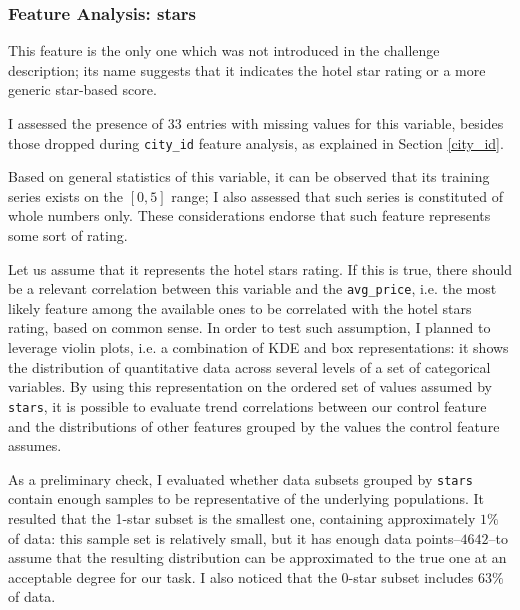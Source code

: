 \documentclass[preprint,12pt,3p]{elsarticle}
\begin{document}
\subsubsection{Feature Analysis: stars}
\label{stars}
This feature is the only one which was not introduced in the challenge description; its name suggests that it indicates the hotel star rating or a more generic star-based score.

I assessed the presence of $33$ entries with missing values for this variable, besides those dropped during \verb|city_id| feature analysis, as explained in Section \ref{city_id}.

Based on general statistics of this variable, it can be observed that its training series exists on the $[0,5]$ range; I also assessed that such series is constituted of whole numbers only. These considerations endorse that such feature represents some sort of rating.

Let us assume that it represents the hotel stars rating. If this is true, there should be a relevant correlation between this variable and the \verb|avg_price|, i.e. the most likely feature among the available ones to be correlated with the hotel stars rating, based on common sense. In order to test such assumption, I planned to leverage violin plots, i.e. a combination of KDE and box representations: it shows the distribution of quantitative data across several levels of a set of categorical variables. By using this representation on the ordered set of values assumed by \verb|stars|, it is possible to evaluate trend correlations between our control feature and the distributions of other features grouped by the values the control feature assumes.

As a preliminary check, I evaluated whether data subsets grouped by \verb|stars| contain enough samples to be representative of the underlying populations. It resulted that the 1-star subset is the smallest one, containing approximately $1\%$ of data: this sample set is relatively small, but it has enough data points--$4642$--to assume that the resulting distribution can be approximated to the true one at an acceptable degree for our task. I also noticed that the 0-star subset includes $63\%$ of data.
\end{document}
